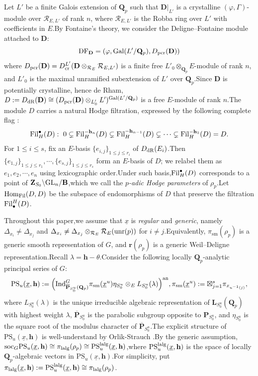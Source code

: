 \documentclass[10pt]{article}
\DeclareMathOperator{\Gal}{Gal}
\newcommand{\pcr}{{\rm pcr}}
\newcommand{\fil}{{\rm Fil}}
\newcommand{\ind}{{\rm Ind}}
\newcommand{\homo}{{\rm Hom}}
\newcommand{\GLN}{{\rm GL}}
\newcommand{\ana}{{\rm an}}
\newcommand{\op}{{\overline{{\mathbf{P}}}}}
\newcommand{\unr}{{\rm unr}}
\newcommand{\soc}{{\rm soc}}
\newcommand{\sm}{{\rm sm}}
\newcommand{\df}{{\mathrm{DF}}}
\newcommand{\wdre}{{\textbf{r}}}
\newcommand{\lalg}{{\rm lalg}}
\newcommand{\dr}{{\rm dR}}
\newcommand{\hpi}{{{\mathbf{h}}}}
\newcommand{\Dpik}{{\mathbf{D}}}
\newcommand{\bB}{{\mathbf{B}}}
\newcommand{\bL}{{\mathbf{L}}}
\newcommand{\bP}{{\mathbf{P}}}
\newcommand{\bQ}{{\mathbf{Q}}}
\newcommand{\bZ}{{\mathbf{Z}}}
\newcommand{\bh}{{\mathbf{h}}}
\newcommand{\cL}{\mathcal L}
\newcommand{\cR}{\mathcal R}
\begin{document}
Let $L'$ be a finite Galois extension of $\bQ_p$ such that $\Dpik|_{L'}$ is a crystalline $(\varphi,\Gamma)$-module over $\cR_{E,L'}$ of rank $n$, where $\cR_{E,L'}$ is the Robba ring over $L'$ with coefficients in $E$.\;By Fontaine's theory, we consider the Deligne--Fontaine module attached to $\Dpik$:
$$\df_{\Dpik}=(\varphi,\Gal(L'/\bQ_p),D_{\pcr}(\Dpik))$$
where $D_{\pcr}(\Dpik)=D_{\mathrm{cr}}^{L'}(\Dpik\otimes_{\cR_{E}}\cR_{E,L'})$ is a finite free $L'_0\otimes_{\bQ_p}E$-module of rank $n$, and $L'_0$ is the maximal unramified subextension of $L'$ over $\bQ_p$.\;Since $\Dpik$ is potentially crystalline, hence de Rham, $D:=D_{\dr}(\Dpik)\cong (D_{\pcr}(\Dpik)\otimes_{L_0'}L')^{\Gal(L'/\bQ_p)}$ is a free $E$-module of rank $n$.\;The module $D$ carries a natural Hodge filtration, expressed by the following complete flag :
\[\fil^{\bullet}_{H}(D): \ 0 \subsetneq \fil^{-\hpi_{n}}_{H}(D) \subsetneq \fil^{-\hpi_{n-1}}_{H}(D) \subsetneq \cdots \subsetneq \fil^{{-\hpi_{1}}}_{H}(D)=D.\]
For $1\leq i\leq s$, fix an $E$-basis $\{e_{i,j}\}_{1\leq j\leq r_i}$ of $D_{\dr}(E_{i})$.\;Then $\{e_{1,j}\}_{1\leq j\leq r_1},\cdots,\{e_{s,j}\}_{1\leq j\leq r_s}$ form an $E$-basis of $D$; we relabel them as $e_{1},e_{2},\cdots,e_{n}$ using lexicographic order.\;Under such basis,\;$\fil^{\bullet}_{H}(D)$ corresponds to a point of $\bZ_{S_0}\backslash \GLN_n/\bB$,\;which we call the \textit{$p$-adic Hodge parameters} of $\rho_p$.\;Let $\homo_{\fil}(D,D)$ be the subspace of endomorphisms of $D$ that preserve the filtration $\fil^{H}_{\bullet}(D)$.\;

Throughout this paper,\;we assume that $\underline{x}$ is \textit{regular} and \textit{generic}, namely $\Delta_{x_i}\neq \Delta_{x_j}$ and $\Delta_{x_i}\neq \Delta_{x_j}\otimes_{\cR_{E}}\cR_{E}(\unr(p))$ for $i\neq j$.\;Equivalently, $\pi_{\mathrm{sm}}(\rho_p)$ is a generic smooth representation of $G$, and $\wdre(\rho_p)$ is a generic Weil--Deligne representation.\;Recall $\lambda=\bh-\theta$.\;Consider the following locally $\bQ_p$-analytic principal series of $G$:
\[\mathrm{PS}_{u}(\underline{x},\bh):=\Big(\ind^G_{\op_{S_0^u}(\bQ_p)}\pi_{\sm}(\underline{x}^u)\eta_{S_0^u}\otimes_E L_{S_0^u}(\lambda)\Big)^{\ana},\pi_{\sm}(\underline{x}^u):=\boxtimes_{j=1}^s\pi_{x_{u^{-1}(j)}},\]
where $L_{S_0^u}(\lambda)$ is the unique irreducible algebraic representation of $\bL_{S_0^u}(\bQ_p)$ with highest weight $\lambda$, $\op_{S_0^u}$ is the parabolic subgroup opposite to $\bP_{S_0^u}$, and $\eta_{S_0^u}$ is the square root of the modulus character of $\op_{S_0^u}$.\;The explicit structure of $\mathrm{PS}_{u}(\underline{x},\bh)$ is well-understand by Orlik-Strauch \cite[The main theorem]{orlik2015jordan}.\;By the generic assumption,\;$\soc_G\mathrm{PS}_{u}(\underline{x},\bh)\cong \pi_{\lalg}(\rho_p)\cong \mathrm{PS}^{\lalg}_{u}(\underline{x},\bh)$,\;where  $\mathrm{PS}^{\lalg}_{u}(\underline{x},\bh)$ is the space of locally $\bQ_p$-algebraic vectors in $\mathrm{PS}_{u}(\underline{x},\bh)$.\;For simplicity, put $\pi_{\lalg}(\underline{x},\bh):=\mathrm{PS}^{\lalg}_{u}(\underline{x},\bh)\cong \pi_{\lalg}(\rho_p)$.\;
\end{document}
